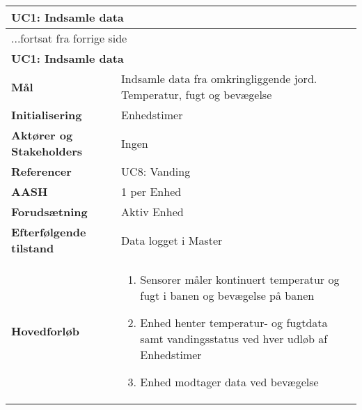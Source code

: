 \begin{center} \centering \label{UC1}
	\begin{longtable}{|p{5cm}|p{9cm}|}  %
	\hline
		\multicolumn{2}{|l|}{\textbf{UC1: Indsamle data}} \\\hline %
		\endfirsthead
		
		\multicolumn{2}{l}{...fortsat fra forrige side} \\ \hline %
		\multicolumn{2}{|l|}{\textbf{UC1: Indsamle data}} \\\hline %
		\endhead	
		
		\textbf{Mål}								&Indsamle data fra omkringliggende jord. Temperatur, fugt og bevægelse			\\\hline
		\textbf{Initialisering}					&Enhedstimer			\\\hline
		\textbf{Aktører og Stakeholders}			&Ingen				\\\hline
		\textbf{Referencer}						&UC8: Vanding		\\\hline
		\textbf{AASH}							&1 per Enhed			\\\hline
		\textbf{Forudsætning}					&Aktiv Enhed		\\\hline
		\textbf{Efterfølgende tilstand}			&Data logget i Master \\\hline
		\textbf{Hovedforløb}					
			&\begin{enumerate}
	
				\item Sensorer måler kontinuert temperatur og fugt i banen og bevægelse på banen
				
				\item Enhed henter temperatur- og fugtdata samt vandingsstatus ved hver udløb af Enhedstimer
				
				\item Enhed modtager data ved bevægelse  
				
			\end{enumerate}\\\hline
	\end{longtable}
\end{center}

